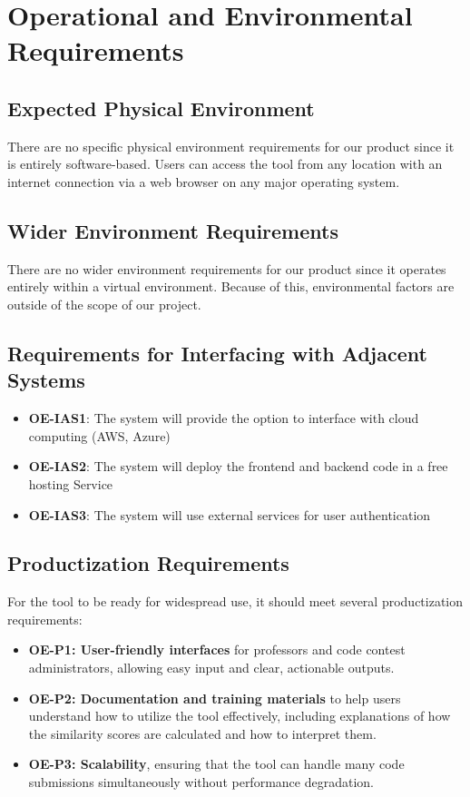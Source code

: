 \documentclass[12pt]{article}
\begin{document}
\section{Operational and Environmental Requirements}
\subsection{Expected Physical Environment}
There are no specific physical environment requirements for our product since it is entirely software-based.
Users can access the tool from any location with an internet connection via a web browser on any major operating system.

\subsection{Wider Environment Requirements}
There are no wider environment requirements for our product since it operates entirely within a virtual environment.
Because of this, environmental factors are outside of the scope of our project.

\subsection{Requirements for Interfacing with Adjacent Systems}
\begin{itemize}
    \item \textbf{OE-IAS1}: The system will provide the option to interface with cloud computing (AWS, Azure) 
    \item \textbf{OE-IAS2}: The system will deploy the frontend and backend code in a free hosting Service
    \item \textbf{OE-IAS3}: The system will use external services for user authentication 
\end{itemize}
\subsection{Productization Requirements}
For the tool to be ready for widespread use, it should meet several productization requirements:
\begin{itemize}
    \item \textbf{OE-P1: User-friendly interfaces} for professors and code contest administrators, allowing easy input and clear, actionable outputs.
    \item \textbf{OE-P2: Documentation and training materials} to help users understand how to utilize the tool effectively, including explanations of how the similarity scores are calculated and how to interpret them.
    \item \textbf{OE-P3: Scalability}, ensuring that the tool can handle many code submissions simultaneously without performance degradation.
\end{itemize}
\end{document}
